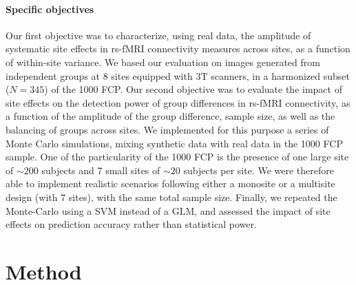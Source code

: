 \documentclass[authoryear]{elsarticle}
\begin{document}
\paragraph{Specific objectives}
Our first objective was to characterize, using real data, the amplitude of
systematic site effects in rs-fMRI connectivity measures across sites, as a function
of within-site variance. We based our evaluation on images generated from
independent groups at 8 sites equipped with 3T scanners, in a harmonized subset
($N=345$) of the 1000 FCP. Our second objective was to evaluate the impact of
site effects on the detection power of group differences in rs-fMRI
connectivity, as a function of the amplitude of the group difference, sample
size, as well as the balancing of groups across sites. We implemented for this
purpose a series of Monte Carlo simulations, mixing synthetic data with real
data in the 1000 FCP sample. One of the particularity of the 1000 FCP is the presence of one large site of $\sim200$ subjects and 7 small sites of $\sim20$ subjects per site. We were therefore able to implement realistic scenarios following either a monosite or a multisite design (with 7 sites), with the same total sample size. Finally, we repeated the Monte-Carlo using a SVM instead of a GLM, and assessed the impact of site effects on prediction accuracy rather than statistical power.

\section{Method}
\end{document}
